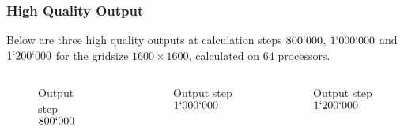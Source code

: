\documentclass[8pt]{beamer}
\begin{document}
\begin{frame}
	\frametitle{High Quality Output}
	Below are three high quality outputs at calculation steps $800`000$, $1`000`000$ and $1`200`000$ for the gridsize $1600 \times 1600$, calculated on $64$ processors.
	\begin{columns}
		\begin{figure}
			\begin{center}
				\caption{Output step $800`000$}
			\end{center}
		\end{figure}
		\begin{figure}
			\begin{center}
				\caption{Output step $1`000`000$}
			\end{center}
		\end{figure}
		\begin{figure}
			\begin{center}
				\caption{Output step $1`200`000$}
			\end{center}
		\end{figure}
	\end{columns}
\end{frame}
\end{document}
